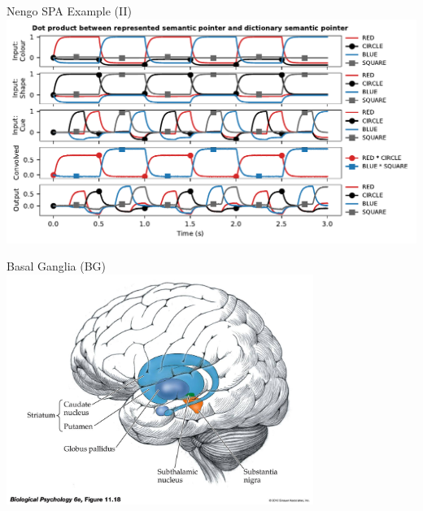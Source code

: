 \documentclass[handout,aspectratio=169]{beamer}
\begin{document}
	\begin{frame}{Nengo SPA Example (II)}
		\centering
		\includegraphics[width=\textwidth]{media/nengo_spa_example.pdf}
	\end{frame}

	

	\begin{frame}{Basal Ganglia (BG)}
		\centering
		\includegraphics[height=7.5cm]{media/basal_ganglia.jpg}
	\end{frame}
\end{document}
